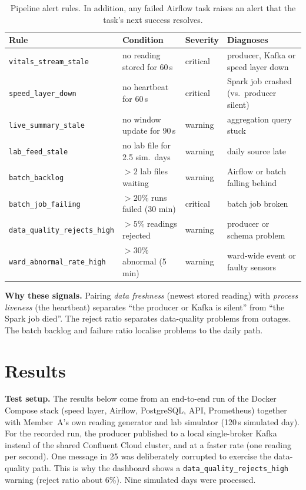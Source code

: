 \documentclass[11pt,a4paper]{article}
\newcommand{\code}[1]{\nolinkurl{#1}}
\begin{document}
\begin{table}[!ht]
\centering\small
\begin{tabularx}{\textwidth}{@{}P{4.4cm}P{3.5cm}P{1.3cm}L@{}}
\toprule
\textbf{Rule} & \textbf{Condition} & \textbf{Severity} & \textbf{Diagnoses} \\
\midrule
\code{vitals_stream_stale} & no reading stored for 60\,s & critical & producer, Kafka or speed layer down \\
\code{speed_layer_down} & no heartbeat for 60\,s & critical & Spark job crashed (vs.\ producer silent) \\
\code{live_summary_stale} & no window update for 90\,s & warning & aggregation query stuck \\
\code{lab_feed_stale} & no lab file for 2.5 sim.\ days & warning & daily source late \\
\code{batch_backlog} & $>2$ lab files waiting & warning & Airflow or batch falling behind \\
\code{batch_job_failing} & $>20\%$ runs failed (30 min) & critical & batch job broken \\
\code{data_quality_rejects_high} & $>5\%$ readings rejected & warning & producer or schema problem \\
\code{ward_abnormal_rate_high} & $>30\%$ abnormal (5 min) & warning & ward-wide event or faulty sensors \\
\bottomrule
\end{tabularx}
\caption{Pipeline alert rules. In addition, any failed Airflow task raises an alert that the
task's next success resolves.}
\end{table}

\textbf{Why these signals.} Pairing \emph{data freshness} (newest stored reading) with
\emph{process liveness} (the heartbeat) separates ``the producer or Kafka is silent'' from ``the
Spark job died''. The reject ratio separates data-quality problems from outages. The batch
backlog and failure ratio localise problems to the daily path.

\section{Results}
\textbf{Test setup.} The results below come from an end-to-end run of the Docker Compose stack
(speed layer, Airflow, PostgreSQL, API, Prometheus) together with Member~A's own reading
generator and lab simulator (120\,s simulated day). For the recorded run, the producer published
to a local single-broker Kafka instead of the shared Confluent Cloud cluster, and at a faster
rate (one reading per second). One message in 25 was deliberately corrupted to exercise the
data-quality path. This is why the dashboard shows a \code{data_quality_rejects_high} warning
(reject ratio about 6\%). Nine simulated days were processed.
\end{document}
